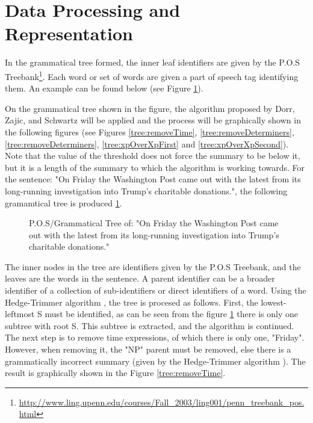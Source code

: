 \section{Data Processing and Representation}
\par In the grammatical tree formed, the inner leaf identifiers are given by the P.O.S Treebank\footnote{\url{http://www.ling.upenn.edu/courses/Fall_2003/ling001/penn_treebank_pos.html}}. Each word or set of words are given a part of speech tag identifying them. An example can be found below (see Figure \ref{tree:origString}).
\par On the grammatical tree shown in the figure, the algorithm proposed by Dorr, Zajic, and Schwartz \cite{dorrzajicschwartz2003} will be applied and the process will be graphically shown in the following figures (see Figures \ref{tree:removeTime}, \ref{tree:removeDeterminers}, \ref{tree:removeDeterminers}, \ref{tree:xpOverXpFirst} and \ref{tree:xpOverXpSecond}). Note that the value of the threshold does not force the summary to be below it, but it is a length of the summary to which the algorithm is working towards. For the sentence: "On Friday the Washington Post came out with the latest from its long-running investigation into Trump's charitable donations.", the following gramamtical tree is produced \ref{tree:origString}.
\begin{figure}[h]
\caption{P.O.S/Grammatical Tree of: "On Friday the Washington Post came out with the latest from its long-running investigation into Trump's charitable donations."}
\label{tree:origString}
\end{figure}
\par The inner nodes in the tree are identifiers given by the P.O.S Treebank, and the leaves are the words in the sentence. A parent identifier can be a broader identifier of a collection of sub-identifiers or direct identifiers of a word. Using the Hedge-Trimmer algorithm \cite{dorrzajicschwartz2003}, the tree is procesed as follows.  First, the lowest-leftmost S must be identified, as can be seen from the figure \ref{tree:origString} there is only one subtree with root S. This subtree is  extracted, and the algorithm is continued. The next step is to remove time expressions, of which there is only one, "Friday". However, when removing it, the "NP" parent must be removed, else there is a grammatically incorrect summary (given by the Hedge-Trimmer algorithm  \cite{dorrzajicschwartz2003}). The result is graphically shown in the Figure \ref{tree:removeTime}.
